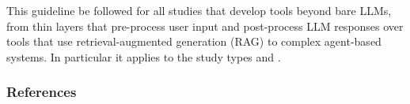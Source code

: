 This guideline \must be followed for all studies that develop tools beyond bare LLMs, from thin layers that pre-process user input and post-process LLM responses over tools that use retrieval-augmented generation (RAG) to complex agent-based systems.
In particular it applies to the study types \newtools and \benchmarkingtasks.



\subsubsection{References}





